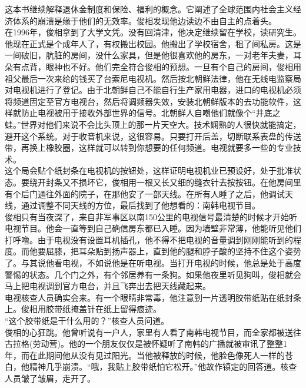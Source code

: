 \begin{multicols}{\theparacolNo}
这本书继续解释退休金制度和保险、福利的概念。它阐述了全球范围内社会主义经济体系的崩溃是缘于他们的无效率。俊相发现他边读边不由自主的点着头。\\

在1996年，俊相拿到了大学文凭。没有回清津，他决定继续留在学校，读研究生。他现在正式是个成年人了，有权搬出校园。他搬出了学校宿舍，租了间私房。这是一间破旧，肮脏的房间，没什么家具，但是他很喜欢他的房东，一对老年夫妻，耳朵有点背，眼神也不好。他们完全符合俊相的预想。一旦有个自己的房间，俊相用祖父最后一次来给的钱买了台索尼电视机。然后按北朝鲜法律，他在无线电监察局对电视机进行了登记。由于北朝鲜自己不能自行生产家用电器，进口的电视机必须将频道固定至官方电视台，然后将调频器失效，安装北朝鲜版本的去功能软件，这样就防止电视被用于接收外部世界的信号。北朝鲜人自嘲他们就像个“井底之蛙。”世界对他们来说不会比头顶上的那一片天空大。技术娴熟的人很快就能搞定，避开这个系统。对于收音机来说，这很容易。只要打开后盖，切断联系表盘的传送带，再换上橡胶圈，这样就可以转到你想要的任何频道。电视就要多一些的专业技术。\\

这个局会贴个纸封条在电视机的按钮处，这样证明电视机业已预设好，处于批准状态。要绕开封条又不损坏它，俊相用一根又长又细的缝衣针去按按钮。在他房间里有个后门通往外面的院子，在那他安了一部天线。在所有人睡了之后，他调试天线，通过调整不同天线的方位，最后找到了他想看的：南韩电视节目。\\

俊相只有当夜深了，来自非军事区以南150公里的电视信号最清楚的时候才开始听电视节目。他会一直等到自己确信房东都已入睡。因为墙壁非常薄，他能听见他们打呼噜。由于电视没有设置耳机插孔，他不得不把电视的音量调到刚刚能听到的程度。而他要屈膝，把耳朵贴到扬声器上，直到他的腿和脖子酸的坚持不住这个姿势了。与其说他看电视，不如说他是在听电视。当打开电视的时候，他总是处于高度警惕的状态。几个门之外，有个邻居养有一条狗。如果他夜里听见狗叫，俊相就会马上把电视调到官方电台，并且飞奔出去把天线藏起来。\\

电视核查人员确实会来。有一个眼睛非常毒，他注意到一片透明胶带纸贴在纸封条上。俊相用胶带纸掩盖针在纸上留得痕迹。\\

“这个胶带纸是干什么用的？”核查人员问道。\\

俊相的心狂跳。他曾听说有一户人，家里有人看了南韩电视节目，而全家都被送往古拉格(劳动营)。他的一个朋友仅仅是被怀疑听了南韩的广播就被审讯了整整1年，而在此期间他从没有见过阳光。当他被释放的时候，他脸色像死人一样的苍白，他精神几乎崩溃。“哦，我贴上胶带纸怕它松开。”他故作镇定的回答道。核查人员皱了皱眉，走开了。\\


\end{multicols}
